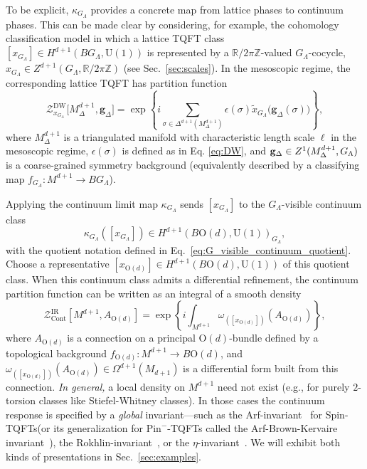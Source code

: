 \documentclass[aps,prx,reprint,superscriptaddress,twocolumn,amsmath,amssymb,amsfonts, nofootinbib]{revtex4-2}
\newcommand{\U}{\text{U}}
\newcommand{\Z}{\mathbb{Z}}
\theoremstyle{apsstyle}
\begin{document}
To be explicit, $\kappa_{G_\Lambda}$ provides a concrete map from lattice phases to continuum phases. This can be made clear by considering, for example, the cohomology classification model in which a lattice TQFT class $[x_{G_{\Lambda}}]\in H^{d+1}(BG_{\Lambda}, \U(1))$ is represented by a $\mathbb{R}/2\pi\Z$-valued $G_{\Lambda}$-cocycle, $x_{G_{\Lambda}}\in Z^{d+1}(G_{\Lambda},\mathbb{R}/2\pi\Z)$ (see Sec.~\ref{sec:scales}). In the mesoscopic regime, the corresponding lattice TQFT has partition function
\begin{equation*}    \mathcal{Z}^{\mathrm{DW}}_{x_{G_{\Lambda}}}\bigl[M^{d+1}_{\Delta}, {\mathbf g}_{\Delta}\bigr]
    =
    \exp\!\left\{
    i\sum_{\sigma\in \Delta^{d+1}(M^{d+1}_{\Delta})}
    \epsilon(\sigma)\widetilde{x}_{G_{\Lambda}}\bigl({\mathbf g}_{\Delta}(\sigma)\bigr)
    \right\},
\end{equation*}
where $M^{d+1}_{\Delta}$ is a triangulated manifold with characteristic length scale $\ell$ in the mesoscopic regime, $\epsilon(\sigma)$ is defined as in Eq. \ref{eq:DW}, and ${\bf g}_{\Delta}\in Z^{1}(M^{d+1}_\Delta,G_{\Lambda})$ is a coarse-grained symmetry background (equivalently described by a classifying map $f_{G_{\Lambda}}: M^{d+1}\to BG_{\Lambda}$).

\bigskip 

Applying the continuum limit map $\kappa_{G_\Lambda}$ sends $[x_{G_{\Lambda}}]$ to the $G_{\Lambda}$-visible continuum class
\begin{equation*}
\kappa_{G_\Lambda}\left([x_{G_{\Lambda}}]\right)
\in H^{d+1}(B\mathrm{O}(d),\U(1))_{G_{\Lambda}},
\end{equation*} 
with the quotient notation defined in Eq.~\eqref{eq:G_visible_continuum_quotient}. Choose a representative $[x_{\mathrm{O}(d)}]\in H^{d+1}(B\mathrm{O}(d),\U(1))$ of this quotient class. When this continuum class admits a differential refinement, the continuum partition function can be written as an integral of a smooth density
\begin{equation*}
\mathcal Z_{\mathrm{Cont}}^{\mathrm{IR}}[M^{d+1}, A_{\mathrm{O}(d)}]
=\exp \left\{ i\int_{M^{d+1}} 
\omega_{\left([x_{\mathrm{O}(d)}]\right)}
\left(A_{\mathrm{O}(d)}\right)\right\},
\end{equation*}
where $A_{\mathrm{O}(d)}$ is a connection on a principal $\mathrm{O}(d)$-bundle defined by a topological background $f_{\mathrm{O}(d)}: M^{d+1}\to B\mathrm{O}(d)$, and $\omega_{\left([x_{\mathrm{O}(d)}]\right)}(A_{\mathrm{O}(d)})\in \Omega^{d+1}(M_{d+1})$ is a differential form built from this connection. \emph{In general,} a local density on $M^{d+1}$ need not exist (e.g., for purely $2$-torsion classes like Stiefel-Whitney classes). In those cases the continuum response is specified by a \emph{global} invariant—such as the Arf-invariant~\cite{Karch2019} for Spin-TQFTs(or its generalization for $\mathrm{Pin}^{-}$-TQFTs called the Arf-Brown-Kervaire invariant~\cite{Debray2018}), the Rokhlin-invariant~\cite{Putrov2017}, or the $\eta$-invariant~\cite{Witten2016, Witten2016_2}. We will exhibit both kinds of presentations in Sec.~\ref{sec:examples}.
\end{document}
